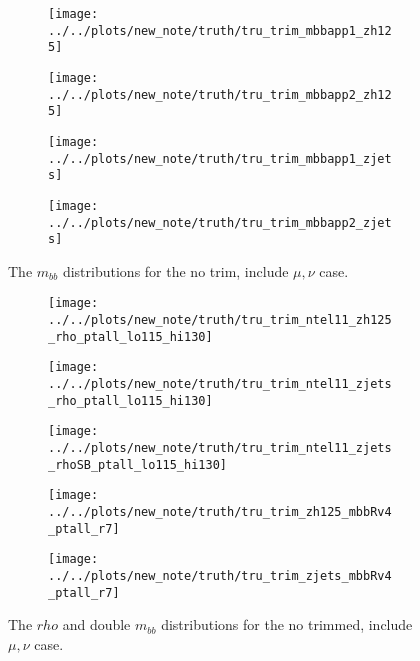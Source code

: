 \begin{figure}[!htbp]\captionsetup{justification=centering}
\begin{center}
\begin{subfigure}[t]{18pc}\centering\texttt{[image: ../../plots/new\_note/truth/tru\_trim\_mbbapp1\_zh125]}\caption{}\end{subfigure}
\begin{subfigure}[t]{18pc}\centering\texttt{[image: ../../plots/new\_note/truth/tru\_trim\_mbbapp2\_zh125]}\caption{}\end{subfigure}
\begin{subfigure}[t]{18pc}\centering\texttt{[image: ../../plots/new\_note/truth/tru\_trim\_mbbapp1\_zjets]}\caption{}\end{subfigure}
\begin{subfigure}[t]{18pc}\centering\texttt{[image: ../../plots/new\_note/truth/tru\_trim\_mbbapp2\_zjets]}\caption{}\end{subfigure}
\caption{\label{fig:mbbtrim}The $m_{bb}$ distributions for the no trim, include $\mu,\nu$ case.}
\end{center}
\end{figure}
\begin{figure}[!htbp]\captionsetup{justification=centering}
\begin{center}
\begin{subfigure}[t]{18pc}\centering\texttt{[image: ../../plots/new\_note/truth/tru\_trim\_ntel11\_zh125\_rho\_ptall\_lo115\_hi130]}\caption{}\end{subfigure}
\begin{subfigure}[t]{18pc}\centering\texttt{[image: ../../plots/new\_note/truth/tru\_trim\_ntel11\_zjets\_rho\_ptall\_lo115\_hi130]}\caption{}\end{subfigure}
\begin{subfigure}[t]{18pc}\centering\texttt{[image: ../../plots/new\_note/truth/tru\_trim\_ntel11\_zjets\_rhoSB\_ptall\_lo115\_hi130]}\caption{}\end{subfigure}
\begin{subfigure}[t]{18pc}\centering\texttt{[image: ../../plots/new\_note/truth/tru\_trim\_zh125\_mbbRv4\_ptall\_r7]}\caption{}\end{subfigure}
\begin{subfigure}[t]{18pc}\centering\texttt{[image: ../../plots/new\_note/truth/tru\_trim\_zjets\_mbbRv4\_ptall\_r7]}\caption{}\end{subfigure}
\caption{\label{fig:mbbtrim}The $rho$ and double $m_{bb}$ distributions for the no trimmed, include $\mu,\nu$ case.}
\end{center}
\end{figure}
